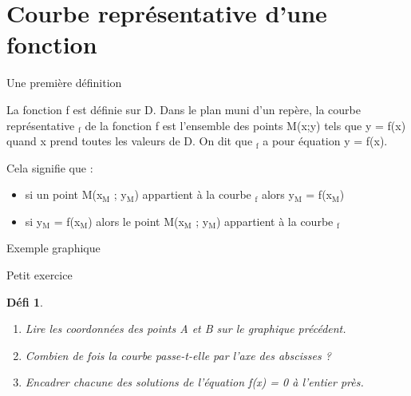 \documentclass[presentation]{beamer}
\newtheorem{defi}{Défi}[section]
\begin{document}
\section{Courbe représentative d'une fonction}
\label{sec:org4541a73}
\begin{frame}[label={sec:orgdb535d4}]{Une première définition}
\begin{definition}
La fonction f est définie sur D. Dans le plan muni d'un repère, la
courbe représentative \(_{\text{f}}\) de la fonction f est l'ensemble
des points M(x;y) tels que y = f(x) quand x prend toutes les
valeurs de D. On dit que \(_{\text{f}}\) a pour équation y = f(x).

Cela signifie que :
\begin{itemize}
\item si un point M(x\(_{\text{M}}\) ; y\(_{\text{M}}\)) appartient à la courbe \(_{\text{f}}\)
alors y\(_{\text{M}}\) = f(x\(_{\text{M}}\))
\item si y\(_{\text{M}}\) = f(x\(_{\text{M}}\)) alors le point M(x\(_{\text{M}}\) ; y\(_{\text{M}}\)) appartient à la courbe
\(_{\text{f}}\)
\end{itemize}
\end{definition}
\end{frame}

\begin{frame}[label={sec:orgb45754f}]{Exemple graphique}
\end{frame}
\begin{frame}[label={sec:orge9c67d1}]{Petit exercice}
\begin{defi}
\begin{enumerate}
\item Lire les coordonnées des points A et B sur le graphique
précédent.
\item Combien de fois la courbe passe-t-elle par l'axe des abscisses ?
\item Encadrer chacune des solutions de l'équation f(x) = 0 à l'entier près.
\end{enumerate}
\end{defi}
\end{frame}
\end{document}
